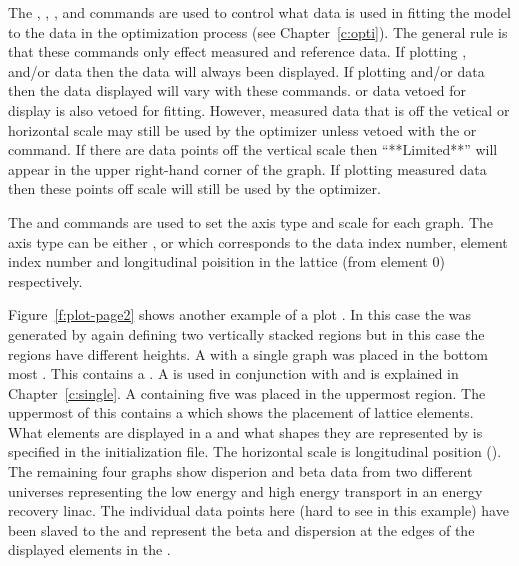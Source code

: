The , , , and  commands are used
to control what data is used in fitting the model to the data in the
optimization process (see Chapter~\ref{c:opti}). The general rule is
that these commands only effect measured and reference data. If
plotting ,  and/or  data then the data
will always been displayed. If plotting  and/or  data
then the data displayed will vary with these commands.   or
 data vetoed for display is also vetoed for fitting.  However,
measured data that is off the vetical or horizontal scale may still be
used by the optimizer unless vetoed with the  or 
command.  If there are data points off the vertical scale then
``**Limited**'' will appear in the upper right-hand corner of the
graph. If plotting measured data then these points off scale will
still be used by the optimizer.

The  and  commands are used to set the axis
type and scale for each graph. The axis type can be either ,
 or  which corresponds to the data index number,
element index number and longitudinal poisition in the lattice (from
element 0) respectively.

Figure~\ref{f:plot-page2} shows another example of a plot .
In this case the  was generated by again defining two
vertically stacked regions but in this case the regions have different
heights.  A  with a single graph was placed in the
bottom most .  This  contains a .
A  is used in conjunction with  and is
explained in Chapter~\ref{c:single}. A  containing
five  was placed in the uppermost region. The uppermost
 of this  contains a  which
shows the placement of lattice elements.  What elements are displayed
in a  and what shapes they are represented by is
specified in the initialization file. The horizontal scale is
longitudinal position ().  The remaining four graphs show
disperion and beta data from two different universes representing the
low energy and high energy transport in an energy recovery linac. The
individual data points here (hard to see in this example) have been
slaved to the  and represent the beta and dispersion at
the edges of the displayed elements in the .



